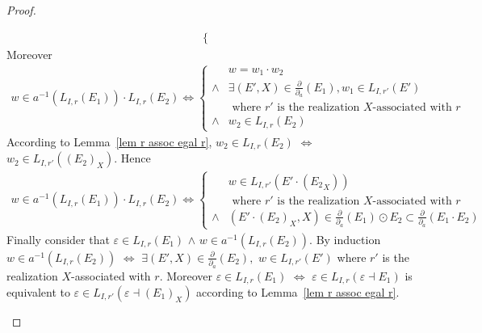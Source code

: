 \documentclass[a4paper]{llncs}
\begin{document}
\begin{proof}
\begin{enumerate}
\begin{align*}
\begin{cases}
        \end{cases}
        \end{align*}            
      Moreover 
        \begin{align*}
        w\in a^{-1}(L_{I,r}(E_1))\cdot L_{I,r}(E_2)
        \Leftrightarrow
        \begin{cases}
          & w=w_1\cdot w_2\\
          \wedge & \exists (E',X)\in\frac{\partial}{\partial_a}(E_1), w_1\in L_{I,r'}(E') \\
          & \text{ where $r'$ is the realization $X$-associated with $r$}\\
          \wedge& w_2\in L_{I,r}(E_2)
        \end{cases}
        \end{align*}      
      According to Lemma~\ref{lem r assoc egal r}, $w_2\in L_{I,r}(E_2)$ $\Leftrightarrow$ $w_2\in L_{I,r'}((E_2)_X)$.      
      Hence
        \begin{align*}
        w\in a^{-1}(L_{I,r}(E_1))\cdot L_{I,r}(E_2)
        \Leftrightarrow
        \begin{cases}
          & w\in L_{I,r'}(E'\cdot ({E_2}_X))\\
          & \text{ where $r'$ is the realization $X$-associated with $r$}\\
          \wedge & (E'\cdot (E_2)_X,X) \in \frac{\partial}{\partial_a}(E_1)\odot E_2\subset \frac{\partial}{\partial_a}(E_1\cdot E_2)
        \end{cases}
        \end{align*}      
      Finally consider that $ \varepsilon\in L_{I,r}(E_1)$ $\wedge$ $w\in a^{-1}(L_{I,r}(E_2))$.      
      By induction $w\in a^{-1}(L_{I,r}(E_2))$      
      $\Leftrightarrow$ $\exists (E',X)\in\frac{\partial}{\partial_a}(E_2),$ $w\in L_{I,r'}(E')$ where $r'$ is the realization $X$-associated with $r$.      
      Moreover $ \varepsilon\in L_{I,r}(E_1)$ $\Leftrightarrow$ $ \varepsilon\in L_{I,r}(\varepsilon \dashv E_1)$ is equivalent to $ \varepsilon\in L_{I,r'}(\varepsilon \dashv (E_1)_X)$ according to Lemma~\ref{lem r assoc egal r}.
      

\end{enumerate}
\end{proof}
\end{document}
